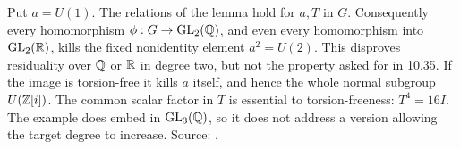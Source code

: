 Put \(a=U(1)\). The relations of the lemma hold for \(a,T\)
in \(G\). Consequently every homomorphism
\(\phi:G\to\operatorname{GL}_2(\mathbb Q)\), and even every homomorphism into
\(\operatorname{GL}_2(\mathbb R)\), kills the fixed nonidentity element
\(a^2=U(2)\). This disproves residuality over \(\mathbb Q\) or \(\mathbb R\)
in degree two, but not the property asked for in 10.35.
If the image is torsion-free it kills \(a\) itself, and hence
the whole normal subgroup \(U(\mathbb Z[i])\).
The common scalar factor in \(T\) is essential to
torsion-freeness: \(T^4=16I\). The example does embed in
\(\operatorname{GL}_3(\mathbb Q)\), so it does not address a version allowing the
target degree to increase. Source:
.
